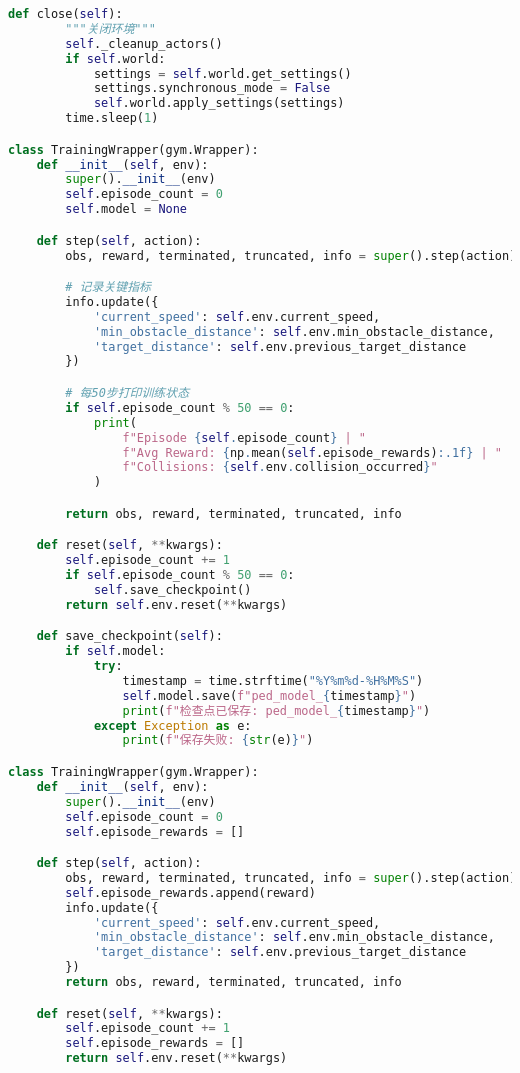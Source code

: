 \begin{lstlisting}[language=Python]
    def close(self):
        """关闭环境"""
        self._cleanup_actors()
        if self.world:
            settings = self.world.get_settings()
            settings.synchronous_mode = False
            self.world.apply_settings(settings)
        time.sleep(1)

class TrainingWrapper(gym.Wrapper):
    def __init__(self, env):
        super().__init__(env)
        self.episode_count = 0
        self.model = None

    def step(self, action):
        obs, reward, terminated, truncated, info = super().step(action)

        # 记录关键指标
        info.update({
            'current_speed': self.env.current_speed,
            'min_obstacle_distance': self.env.min_obstacle_distance,
            'target_distance': self.env.previous_target_distance
        })

        # 每50步打印训练状态
        if self.episode_count % 50 == 0:
            print(
                f"Episode {self.episode_count} | "
                f"Avg Reward: {np.mean(self.episode_rewards):.1f} | "
                f"Collisions: {self.env.collision_occurred}"
            )

        return obs, reward, terminated, truncated, info

    def reset(self, **kwargs):
        self.episode_count += 1
        if self.episode_count % 50 == 0:
            self.save_checkpoint()
        return self.env.reset(**kwargs)

    def save_checkpoint(self):
        if self.model:
            try:
                timestamp = time.strftime("%Y%m%d-%H%M%S")
                self.model.save(f"ped_model_{timestamp}")
                print(f"检查点已保存: ped_model_{timestamp}")
            except Exception as e:
                print(f"保存失败: {str(e)}")

class TrainingWrapper(gym.Wrapper):
    def __init__(self, env):
        super().__init__(env)
        self.episode_count = 0
        self.episode_rewards = []

    def step(self, action):
        obs, reward, terminated, truncated, info = super().step(action)
        self.episode_rewards.append(reward)
        info.update({
            'current_speed': self.env.current_speed,
            'min_obstacle_distance': self.env.min_obstacle_distance,
            'target_distance': self.env.previous_target_distance
        })
        return obs, reward, terminated, truncated, info

    def reset(self, **kwargs):
        self.episode_count += 1
        self.episode_rewards = []
        return self.env.reset(**kwargs)



\end{lstlisting}
